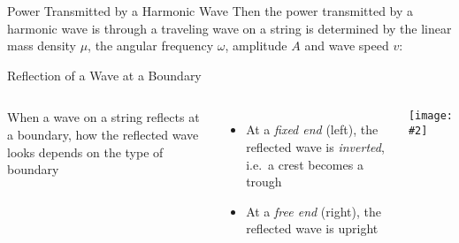 \documentclass[12pt,aspectratio=169]{beamer}
\newcommand{\pic}[2]{\texttt{[image: \#2]}}
\newcommand{\eq}[2]{\vspace{#1}{\Large\begin{displaymath}#2\end{displaymath}}}
\begin{document}
\begin{frame}{Power Transmitted by a Harmonic Wave}
  Then the power transmitted by a harmonic wave is through a traveling wave on
  a string is determined by the linear mass density $\mu$, the angular frequency
  $\omega$, amplitude $A$ and wave speed $v$:

  \eq{-.2in}{
    \boxed{P=\frac{1}{2}\mu\omega^2A^2v}
  }
\end{frame}
%
%
%  


\begin{frame}{Reflection of a Wave at a Boundary}
  \begin{columns}
    When a wave on a string reflects at a boundary, how the reflected wave looks
    depends on the type of boundary
    \begin{itemize}
    \item At a \emph{fixed end} (left), the reflected wave is \emph{inverted},
      i.e.\ a crest becomes a trough
    \item At a \emph{free end} (right), the reflected wave is upright
    \end{itemize}
    
    \pic{1}{22.jpg}
  \end{columns}
\end{frame}
\end{document}
